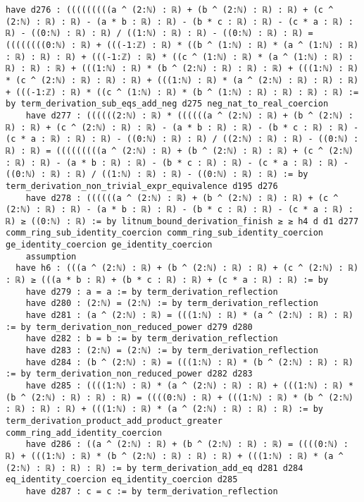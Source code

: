 \documentclass{article}
\begin{document}
\begin{tcolorbox}[colback=white!10, width=\linewidth]
\begin{lstlisting}[language=Lean4]
    have d276 : (((((((((a ^ (2:ℕ) : ℝ) + (b ^ (2:ℕ) : ℝ) : ℝ) + (c ^ (2:ℕ) : ℝ) : ℝ) - (a * b : ℝ) : ℝ) - (b * c : ℝ) : ℝ) - (c * a : ℝ) : ℝ) - ((0:ℕ) : ℝ) : ℝ) / ((1:ℕ) : ℝ) : ℝ) - ((0:ℕ) : ℝ) : ℝ) = ((((((((0:ℕ) : ℝ) + (((-1:ℤ) : ℝ) * ((b ^ (1:ℕ) : ℝ) * (a ^ (1:ℕ) : ℝ) : ℝ) : ℝ) : ℝ) + (((-1:ℤ) : ℝ) * ((c ^ (1:ℕ) : ℝ) * (a ^ (1:ℕ) : ℝ) : ℝ) : ℝ) : ℝ) + (((1:ℕ) : ℝ) * (b ^ (2:ℕ) : ℝ) : ℝ) : ℝ) + (((1:ℕ) : ℝ) * (c ^ (2:ℕ) : ℝ) : ℝ) : ℝ) + (((1:ℕ) : ℝ) * (a ^ (2:ℕ) : ℝ) : ℝ) : ℝ) + (((-1:ℤ) : ℝ) * ((c ^ (1:ℕ) : ℝ) * (b ^ (1:ℕ) : ℝ) : ℝ) : ℝ) : ℝ) := by term_derivation_sub_eqs_add_neg d275 neg_nat_to_real_coercion
    have d277 : ((((((2:ℕ) : ℝ) * ((((((a ^ (2:ℕ) : ℝ) + (b ^ (2:ℕ) : ℝ) : ℝ) + (c ^ (2:ℕ) : ℝ) : ℝ) - (a * b : ℝ) : ℝ) - (b * c : ℝ) : ℝ) - (c * a : ℝ) : ℝ) : ℝ) - ((0:ℕ) : ℝ) : ℝ) / ((2:ℕ) : ℝ) : ℝ) - ((0:ℕ) : ℝ) : ℝ) = (((((((((a ^ (2:ℕ) : ℝ) + (b ^ (2:ℕ) : ℝ) : ℝ) + (c ^ (2:ℕ) : ℝ) : ℝ) - (a * b : ℝ) : ℝ) - (b * c : ℝ) : ℝ) - (c * a : ℝ) : ℝ) - ((0:ℕ) : ℝ) : ℝ) / ((1:ℕ) : ℝ) : ℝ) - ((0:ℕ) : ℝ) : ℝ) := by term_derivation_non_trivial_expr_equivalence d195 d276
    have d278 : ((((((a ^ (2:ℕ) : ℝ) + (b ^ (2:ℕ) : ℝ) : ℝ) + (c ^ (2:ℕ) : ℝ) : ℝ) - (a * b : ℝ) : ℝ) - (b * c : ℝ) : ℝ) - (c * a : ℝ) : ℝ) ≥ ((0:ℕ) : ℝ) := by litnum_bound_derivation_finish ≥ ≥ h4 d d1 d277 comm_ring_sub_identity_coercion comm_ring_sub_identity_coercion ge_identity_coercion ge_identity_coercion
    assumption
  have h6 : (((a ^ (2:ℕ) : ℝ) + (b ^ (2:ℕ) : ℝ) : ℝ) + (c ^ (2:ℕ) : ℝ) : ℝ) ≥ (((a * b : ℝ) + (b * c : ℝ) : ℝ) + (c * a : ℝ) : ℝ) := by
    have d279 : a = a := by term_derivation_reflection
    have d280 : (2:ℕ) = (2:ℕ) := by term_derivation_reflection
    have d281 : (a ^ (2:ℕ) : ℝ) = (((1:ℕ) : ℝ) * (a ^ (2:ℕ) : ℝ) : ℝ) := by term_derivation_non_reduced_power d279 d280
    have d282 : b = b := by term_derivation_reflection
    have d283 : (2:ℕ) = (2:ℕ) := by term_derivation_reflection
    have d284 : (b ^ (2:ℕ) : ℝ) = (((1:ℕ) : ℝ) * (b ^ (2:ℕ) : ℝ) : ℝ) := by term_derivation_non_reduced_power d282 d283
    have d285 : ((((1:ℕ) : ℝ) * (a ^ (2:ℕ) : ℝ) : ℝ) + (((1:ℕ) : ℝ) * (b ^ (2:ℕ) : ℝ) : ℝ) : ℝ) = ((((0:ℕ) : ℝ) + (((1:ℕ) : ℝ) * (b ^ (2:ℕ) : ℝ) : ℝ) : ℝ) + (((1:ℕ) : ℝ) * (a ^ (2:ℕ) : ℝ) : ℝ) : ℝ) := by term_derivation_product_add_product_greater comm_ring_add_identity_coercion
    have d286 : ((a ^ (2:ℕ) : ℝ) + (b ^ (2:ℕ) : ℝ) : ℝ) = ((((0:ℕ) : ℝ) + (((1:ℕ) : ℝ) * (b ^ (2:ℕ) : ℝ) : ℝ) : ℝ) + (((1:ℕ) : ℝ) * (a ^ (2:ℕ) : ℝ) : ℝ) : ℝ) := by term_derivation_add_eq d281 d284 eq_identity_coercion eq_identity_coercion d285
    have d287 : c = c := by term_derivation_reflection

\end{lstlisting}
\end{tcolorbox}
\end{document}

